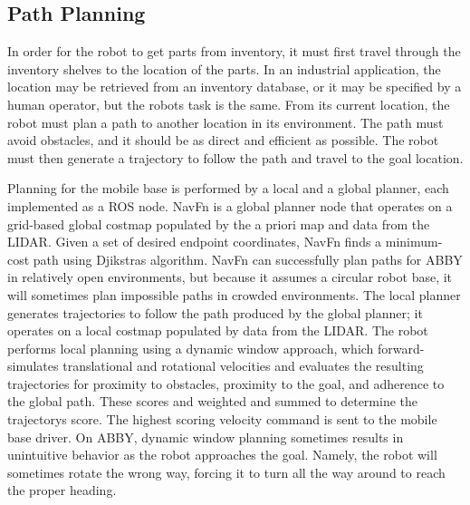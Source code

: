 \documentclass{article}
\begin{document}
\subsection[Path Planning]{Path Planning}
In order for the robot to get parts from inventory, it must first travel through the inventory shelves to the location of the parts. In an industrial application, the location may be retrieved from an inventory database, or it may be specified by a human operator, but the robot{\textquotesingle}s task is the same. From its current location, the robot must plan a path to another location in its environment. The path must avoid obstacles, and it should be as direct and efficient as possible. The robot must then generate a trajectory to follow the path and travel to the goal location.

Planning for the mobile base is performed by a local and a global planner, each implemented as a ROS node. NavFn\cite{navfn} is a global planner node that operates on a grid-based global costmap populated by the a priori map and data from the LIDAR. Given a set of desired endpoint coordinates, NavFn finds a minimum-cost path using Djikstra{\textquotesingle}s algorithm\cite{djikstra}. NavFn can successfully plan paths for ABBY in relatively open environments, but because it assumes a circular robot base, it will sometimes plan impossible paths in crowded environments. The local planner generates trajectories to follow the path produced by the global planner; it operates on a local costmap populated by data from the LIDAR. The robot performs local planning using a dynamic window approach,\cite{probabilistic-robotics} which forward-simulates translational and rotational velocities and evaluates the resulting trajectories for proximity to obstacles, proximity to the goal, and adherence to the global path. These scores and weighted and summed to determine the trajectory{\textquotesingle}s score. The highest scoring velocity command is sent to the mobile base driver. On ABBY, dynamic window planning sometimes results in unintuitive behavior as the robot approaches the goal. Namely, the robot will sometimes rotate the wrong way, forcing it to turn all the way around to reach the proper heading.
\end{document}
